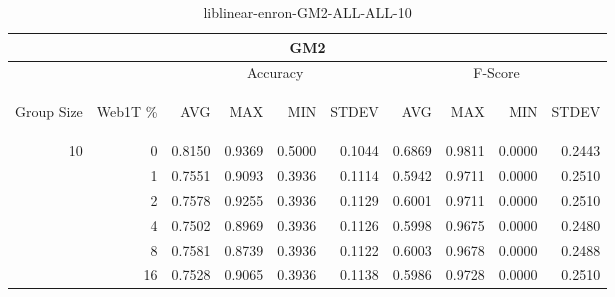 \begin{center}
\begin{table}[htbp]
\begin{tabular}{ | r | r | r | r | r | r | r | r | r | r |}
\hline
\multicolumn{10}{|c|}{GM2}\\
\hline
 & & \multicolumn{4}{|c|}{Accuracy} & \multicolumn{4}{|c|}{F-Score}\\ \cline{3-10}
\begin{sideways}Group Size\end{sideways} & \begin{sideways}Web1T \%\end{sideways} & \begin{sideways}AVG\end{sideways} & \begin{sideways}MAX\end{sideways} & \begin{sideways}MIN\end{sideways} & \begin{sideways}STDEV\end{sideways} & \begin{sideways}AVG\end{sideways} & \begin{sideways}MAX\end{sideways} & \begin{sideways}MIN\end{sideways} & \begin{sideways}STDEV\end{sideways}\\
\hline
\multirow{5}{*}{10}
 & 0 & 0.8150 & 0.9369 & 0.5000 & 0.1044 & 0.6869 & 0.9811 & 0.0000 & 0.2443\\ \cline{2-10}
 & 1 & 0.7551 & 0.9093 & 0.3936 & 0.1114 & 0.5942 & 0.9711 & 0.0000 & 0.2510\\ \cline{2-10}
 & 2 & 0.7578 & 0.9255 & 0.3936 & 0.1129 & 0.6001 & 0.9711 & 0.0000 & 0.2510\\ \cline{2-10}
 & 4 & 0.7502 & 0.8969 & 0.3936 & 0.1126 & 0.5998 & 0.9675 & 0.0000 & 0.2480\\ \cline{2-10}
 & 8 & 0.7581 & 0.8739 & 0.3936 & 0.1122 & 0.6003 & 0.9678 & 0.0000 & 0.2488\\ \cline{2-10}
 & 16 & 0.7528 & 0.9065 & 0.3936 & 0.1138 & 0.5986 & 0.9728 & 0.0000 & 0.2510\\ \cline{2-10}
\hline
\end{tabular}
\caption{liblinear-enron-GM2-ALL-ALL-10}
\label{table:liblinear-enron-GM2-ALL-ALL-10}
\end{table}
\end{center}

